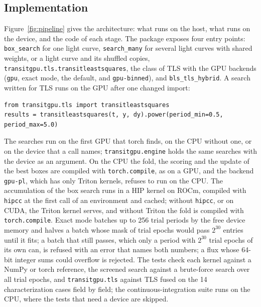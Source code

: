 \documentclass{aastex631}
\begin{document}
\subsection{Implementation}\label{sec:implementation}
Figure~\ref{fig:pipeline} gives the architecture: what runs on the host, what runs on the device, and the code of each stage. The package exposes four entry points: \texttt{box\_search} for one light curve, \texttt{search\_many} for several light curves with shared weights, or a light curve and its shuffled copies, \texttt{transitgpu.tls.transitleastsquares}, the class of TLS with the GPU backends (\texttt{gpu}, exact mode, the default, and \texttt{gpu-binned}), and \texttt{bls\_tls\_hybrid}. A search written for TLS runs on the GPU after one changed import:
\begin{verbatim}
from transitgpu.tls import transitleastsquares
results = transitleastsquares(t, y, dy).power(period_min=0.5, period_max=5.0)
\end{verbatim}
The searches run on the first GPU that torch finds, on the CPU without one, or on the device that a call names; \texttt{transitgpu.engine} holds the same searches with the device as an argument. On the CPU the fold, the scoring and the update of the best boxes are compiled with \texttt{torch.compile}, as on a GPU, and the backend \texttt{gpu-pl}, which has only Triton kernels, refuses to run on the CPU. The accumulation of the box search runs in a HIP kernel on ROCm, compiled with \texttt{hipcc} at the first call of an environment and cached; without \texttt{hipcc}, or on CUDA, the Triton kernel serves, and without Triton the fold is compiled with \texttt{torch.compile}. Exact mode batches up to 256 trial periods by the free device memory and halves a batch whose mask of trial epochs would pass $2^{30}$ entries until it fits; a batch that still passes, which only a period with $2^{30}$ trial epochs of its own can, is refused with an error that names both numbers; a flux whose 64-bit integer sums could overflow is rejected. The tests check each kernel against a NumPy or torch reference, the screened search against a brute-force search over all trial epochs, and \texttt{transitgpu.tls} against TLS fused on the 14 characterization cases field by field; the continuous-integration suite runs on the CPU, where the tests that need a device are skipped.
\end{document}
